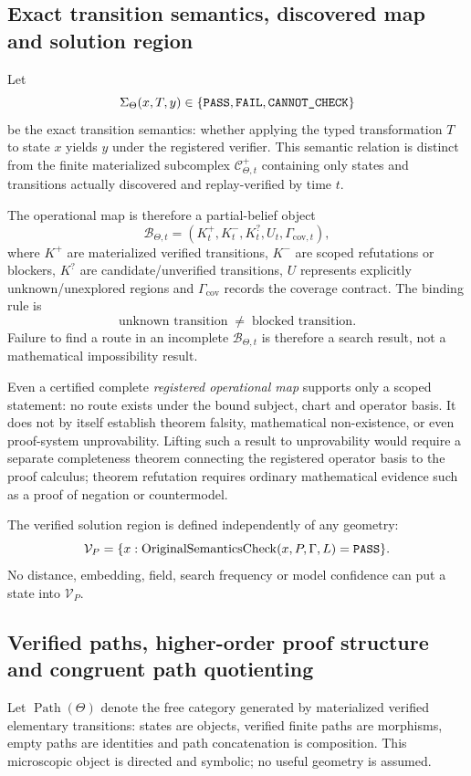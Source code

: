\subsection{Exact transition semantics, discovered map and solution region}
Let
\[
\Sigma_{\Theta}(x,T,y)\in\{\texttt{PASS},\texttt{FAIL},\texttt{CANNOT\_CHECK}\}
\]
be the exact transition semantics: whether applying the typed transformation $T$ to state $x$ yields $y$ under the registered verifier. This semantic relation is distinct from the finite materialized subcomplex $\mathcal C^+_{\Theta,t}$ containing only states and transitions actually discovered and replay-verified by time $t$.

The operational map is therefore a partial-belief object
\[
\mathcal B_{\Theta,t}=(K^+_t,K^-_t,K^?_t,U_t,\Gamma_{\mathrm{cov},t}),
\]
where $K^+$ are materialized verified transitions, $K^-$ are scoped refutations or blockers, $K^?$ are candidate/unverified transitions, $U$ represents explicitly unknown/unexplored regions and $\Gamma_{\mathrm{cov}}$ records the coverage contract. The binding rule is
\[
\boxed{\text{unknown transition}\;\neq\;\text{blocked transition}.}
\]
Failure to find a route in an incomplete $\mathcal B_{\Theta,t}$ is therefore a search result, not a mathematical impossibility result.

Even a certified complete \emph{registered operational map} supports only a scoped statement: no route exists under the bound subject, chart and operator basis. It does not by itself establish theorem falsity, mathematical non-existence, or even proof-system unprovability. Lifting such a result to unprovability would require a separate completeness theorem connecting the registered operator basis to the proof calculus; theorem refutation requires ordinary mathematical evidence such as a proof of negation or countermodel.

The verified solution region is defined independently of any geometry:
\[
\mathcal V_P=\{x:\operatorname{OriginalSemanticsCheck}(x,P,\Gamma,L)=\texttt{PASS}\}.
\]
No distance, embedding, field, search frequency or model confidence can put a state into $\mathcal V_P$.

\subsection{Verified paths, higher-order proof structure and congruent path quotienting}
Let $\operatorname{Path}(\Theta)$ denote the free category generated by materialized verified elementary transitions: states are objects, verified finite paths are morphisms, empty paths are identities and path concatenation is composition. This microscopic object is directed and symbolic; no useful geometry is assumed.

